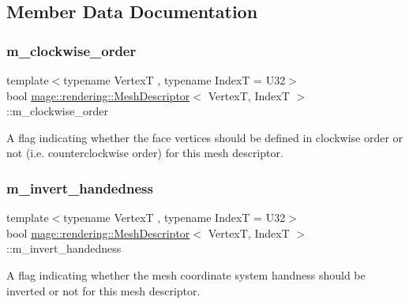 \subsection{Member Data Documentation}
\mbox{\label{classmage_1_1rendering_1_1_mesh_descriptor_a24ad440002ac7a4db6f0cb642ae1477d}} 
\subsubsection{\texorpdfstring{m\+\_\+clockwise\+\_\+order}{m\_clockwise\_order}}
{\footnotesize\ttfamily template$<$typename VertexT , typename IndexT  = U32$>$ \\
bool \mbox{\hyperlink{classmage_1_1rendering_1_1_mesh_descriptor}{mage\+::rendering\+::\+Mesh\+Descriptor}}$<$ VertexT, IndexT $>$\+::m\+\_\+clockwise\+\_\+order\hspace{0.3cm}{\ttfamily [private]}}

A flag indicating whether the face vertices should be defined in clockwise order or not (i.\+e. counterclockwise order) for this mesh descriptor. \mbox{\label{classmage_1_1rendering_1_1_mesh_descriptor_a61d5b541414f827f43ec835c7f2da462}} 
\subsubsection{\texorpdfstring{m\+\_\+invert\+\_\+handedness}{m\_invert\_handedness}}
{\footnotesize\ttfamily template$<$typename VertexT , typename IndexT  = U32$>$ \\
bool \mbox{\hyperlink{classmage_1_1rendering_1_1_mesh_descriptor}{mage\+::rendering\+::\+Mesh\+Descriptor}}$<$ VertexT, IndexT $>$\+::m\+\_\+invert\+\_\+handedness\hspace{0.3cm}{\ttfamily [private]}}

A flag indicating whether the mesh coordinate system handness should be inverted or not for this mesh descriptor. 
